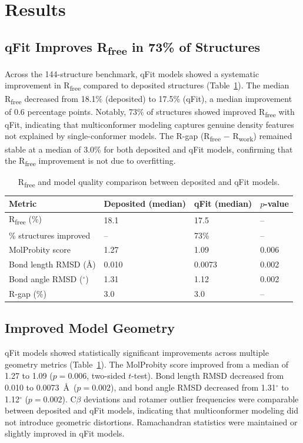 \documentclass[12pt]{article}
\begin{document}
\section{Results}

\subsection{qFit Improves R\textsubscript{free} in 73\% of Structures}

Across the 144-structure benchmark, qFit models showed a systematic improvement in R\textsubscript{free} compared to deposited structures (Table~\ref{tab:rfree}). The median R\textsubscript{free} decreased from 18.1\% (deposited) to 17.5\% (qFit), a median improvement of 0.6 percentage points. Notably, 73\% of structures showed improved R\textsubscript{free} with qFit, indicating that multiconformer modeling captures genuine density features not explained by single-conformer models. The R-gap (R\textsubscript{free} $-$ R\textsubscript{work}) remained stable at a median of 3.0\% for both deposited and qFit models, confirming that the R\textsubscript{free} improvement is not due to overfitting.

\begin{table}[ht]
\centering
\caption{R\textsubscript{free} and model quality comparison between deposited and qFit models.}
\label{tab:rfree}
\begin{tabular}{llll}
\toprule
Metric & Deposited (median) & qFit (median) & $p$-value \\
\midrule
R\textsubscript{free} (\%) & 18.1 & 17.5 & -- \\
\% structures improved & -- & 73\% & -- \\
MolProbity score & 1.27 & 1.09 & 0.006 \\
Bond length RMSD (\AA) & 0.010 & 0.0073 & 0.002 \\
Bond angle RMSD ($^{\circ}$) & 1.31 & 1.12 & 0.002 \\
R-gap (\%) & 3.0 & 3.0 & -- \\
\bottomrule
\end{tabular}
\end{table}

\subsection{Improved Model Geometry}

qFit models showed statistically significant improvements across multiple geometry metrics (Table~\ref{tab:rfree}). The MolProbity score improved from a median of 1.27 to 1.09 ($p = 0.006$, two-sided $t$-test). Bond length RMSD decreased from 0.010 to 0.0073~\AA~($p = 0.002$), and bond angle RMSD decreased from 1.31$^{\circ}$ to 1.12$^{\circ}$ ($p = 0.002$). C$\beta$ deviations and rotamer outlier frequencies were comparable between deposited and qFit models, indicating that multiconformer modeling did not introduce geometric distortions. Ramachandran statistics were maintained or slightly improved in qFit models.
\end{document}
